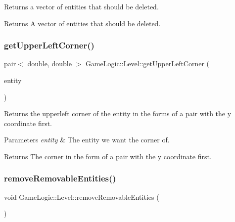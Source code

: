 Returns a vector of entities that should be deleted. \begin{DoxyReturn}{Returns}
A vector of entities that should be deleted. 
\end{DoxyReturn}
\mbox{\label{classGameLogic_1_1Level_ae6edaa461fc6cd170387a3d7b3e16d1f}} 
\subsubsection{\texorpdfstring{get\+Upper\+Left\+Corner()}{getUpperLeftCorner()}}
{\footnotesize\ttfamily pair$<$ double, double $>$ Game\+Logic\+::\+Level\+::get\+Upper\+Left\+Corner (\begin{DoxyParamCaption}\item[{shared\+\_\+ptr$<$ \hyperlink{classGameLogic_1_1Entity}{Entity} $>$}]{entity }\end{DoxyParamCaption})}

Returns the upperleft corner of the entity in the forms of a pair with the y coordinate first. 
\begin{DoxyParams}{Parameters}
{\em entity} & The entity we want the corner of. \\
\hline
\end{DoxyParams}
\begin{DoxyReturn}{Returns}
The corner in the form of a pair with the y coordinate first. 
\end{DoxyReturn}
\mbox{\label{classGameLogic_1_1Level_a6f581d8c053ae5a9d5b6a333b455038f}} 
\subsubsection{\texorpdfstring{remove\+Removable\+Entities()}{removeRemovableEntities()}}
{\footnotesize\ttfamily void Game\+Logic\+::\+Level\+::remove\+Removable\+Entities (\begin{DoxyParamCaption}{ }\end{DoxyParamCaption})}

